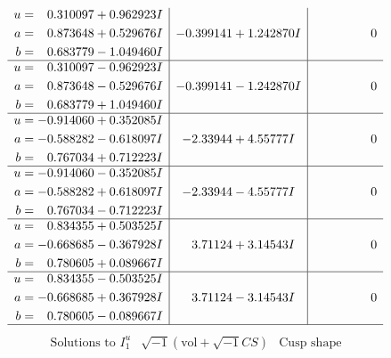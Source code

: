 \documentclass[1p]{elsarticle_modified}
\theoremstyle{definition}
\newcommand{\I}{\sqrt{-1}}
\begin{document}
$$\begin{array}{c|c|c}
\begin{aligned}
u &= \phantom{-}0.310097 + 0.962923 I \\
a &= \phantom{-}0.873648 + 0.529676 I \\
b &= \phantom{-}0.683779 - 1.049460 I\end{aligned}
 & -0.399141 + 1.242870 I & \phantom{-0.000000 } 0 \\ \hline\begin{aligned}
u &= \phantom{-}0.310097 - 0.962923 I \\
a &= \phantom{-}0.873648 - 0.529676 I \\
b &= \phantom{-}0.683779 + 1.049460 I\end{aligned}
 & -0.399141 - 1.242870 I & \phantom{-0.000000 } 0 \\ \hline\begin{aligned}
u &= -0.914060 + 0.352085 I \\
a &= -0.588282 - 0.618097 I \\
b &= \phantom{-}0.767034 + 0.712223 I\end{aligned}
 & -2.33944 + 4.55777 I & \phantom{-0.000000 } 0 \\ \hline\begin{aligned}
u &= -0.914060 - 0.352085 I \\
a &= -0.588282 + 0.618097 I \\
b &= \phantom{-}0.767034 - 0.712223 I\end{aligned}
 & -2.33944 - 4.55777 I & \phantom{-0.000000 } 0 \\ \hline\begin{aligned}
u &= \phantom{-}0.834355 + 0.503525 I \\
a &= -0.668685 - 0.367928 I \\
b &= \phantom{-}0.780605 + 0.089667 I\end{aligned}
 & \phantom{-}3.71124 + 3.14543 I & \phantom{-0.000000 } 0 \\ \hline\begin{aligned}
u &= \phantom{-}0.834355 - 0.503525 I \\
a &= -0.668685 + 0.367928 I \\
b &= \phantom{-}0.780605 - 0.089667 I\end{aligned}
 & \phantom{-}3.71124 - 3.14543 I & \phantom{-0.000000 } 0\\
 \hline 
 \end{array}$$\newpage$$\begin{array}{c|c|c}  
\text{Solutions to }I^u_{1}& \I (\text{vol} + \sqrt{-1}CS) & \text{Cusp shape}\\

\end{array}$$
\end{document}
